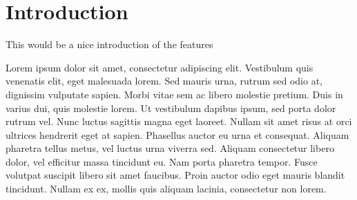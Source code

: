\chapter{Introduction}
This would be a nice introduction of the features




\begin{file}
	Lorem ipsum dolor sit amet, consectetur adipiscing elit. Vestibulum quis venenatis elit, eget malesuada lorem. Sed mauris urna, rutrum sed odio at, dignissim vulputate sapien. Morbi vitae sem ac libero molestie pretium. Duis in varius dui, quis molestie lorem. Ut vestibulum dapibus ipsum, sed porta dolor rutrum vel. Nunc luctus sagittis magna eget laoreet. Nullam sit amet risus at orci ultrices hendrerit eget at sapien. Phasellus auctor eu urna et consequat. Aliquam pharetra tellus metus, vel luctus urna viverra sed. Aliquam consectetur libero dolor, vel efficitur massa tincidunt eu. Nam porta pharetra tempor. Fusce volutpat suscipit libero sit amet faucibus. Proin auctor odio eget mauris blandit tincidunt. Nullam ex ex, mollis quis aliquam lacinia, consectetur non lorem. 
\end{file}